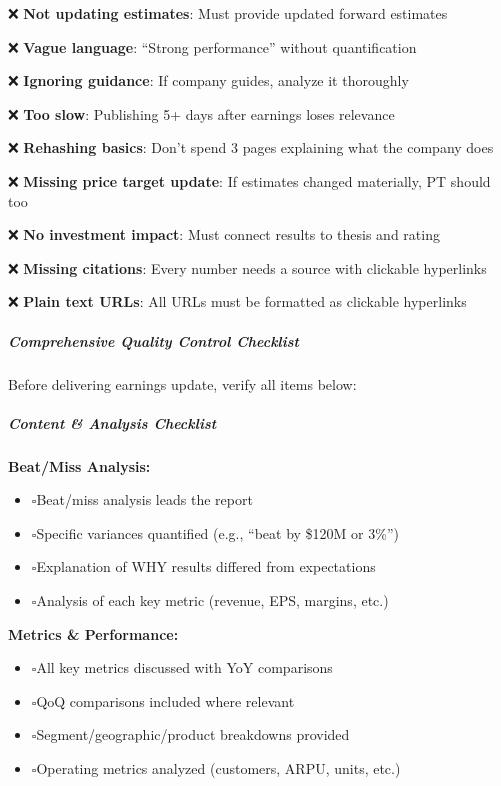 \documentclass[11pt]{article}
\newcommand{\UncheckedBox}{$\square$}
\begin{document}
❌ \textbf{Not updating estimates}: Must provide updated forward estimates


❌ \textbf{Vague language}: ``Strong performance'' without quantification


❌ \textbf{Ignoring guidance}: If company guides, analyze it thoroughly


❌ \textbf{Too slow}: Publishing 5+ days after earnings loses relevance


❌ \textbf{Rehashing basics}: Don't spend 3 pages explaining what the company does


❌ \textbf{Missing price target update}: If estimates changed materially, PT should too


❌ \textbf{No investment impact}: Must connect results to thesis and rating


❌ \textbf{Missing citations}: Every number needs a source with clickable hyperlinks


❌ \textbf{Plain text URLs}: All URLs must be formatted as clickable hyperlinks


\subparagraph{Comprehensive Quality Control Checklist}\mbox{}\par

Before delivering earnings update, verify all items below:


\subparagraph{Content \& Analysis Checklist}\mbox{}\par

\textbf{Beat/Miss Analysis:}

\begin{itemize}[leftmargin=*,itemsep=2pt,topsep=2pt]
\item {} \UncheckedBox Beat/miss analysis leads the report
\item {} \UncheckedBox Specific variances quantified (e.g., ``beat by \$120M or 3\%'')
\item {} \UncheckedBox Explanation of WHY results differed from expectations
\item {} \UncheckedBox Analysis of each key metric (revenue, EPS, margins, etc.)
\end{itemize}

\textbf{Metrics \& Performance:}

\begin{itemize}[leftmargin=*,itemsep=2pt,topsep=2pt]
\item {} \UncheckedBox All key metrics discussed with YoY comparisons
\item {} \UncheckedBox QoQ comparisons included where relevant
\item {} \UncheckedBox Segment/geographic/product breakdowns provided
\item {} \UncheckedBox Operating metrics analyzed (customers, ARPU, units, etc.)
\end{itemize}
\end{document}
